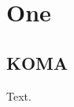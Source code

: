 \documentclass[11pt,a4paper,oneside]{scrbook}
\begin{document}
\tableofcontents\chapter{One}\section{KOMA} Text.
\end{document}
